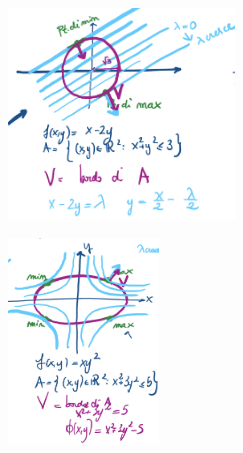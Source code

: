 \begin{figure}[h!]
\vspace{-10pt}
\centering
\begin{subfigure}{.45\textwidth}
    \centering
    \includegraphics[width=6cm]{images/molt-lagrange-1.png}
\end{subfigure}
\begin{subfigure}{.45\textwidth}
    \centering
    \includegraphics[width=4cm]{images/molt-lagrange-2.png}
\end{subfigure}
\end{figure}
\vspace{-15pt}
